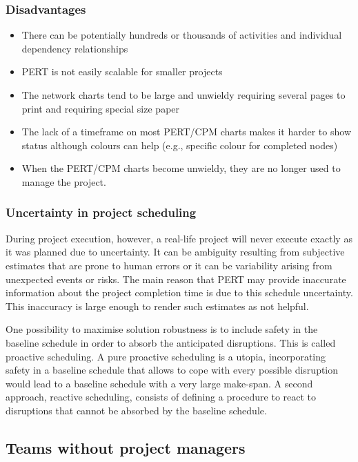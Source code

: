 \subsubsection{Disadvantages}
\begin{itemize}
\item There can be potentially hundreds or thousands of activities and individual dependency relationships
\item PERT is not easily scalable for smaller projects
\item The network charts tend to be large and unwieldy requiring several pages to print and requiring special size paper
\item The lack of a timeframe on most PERT/CPM charts makes it harder to show status although colours can help (e.g., specific colour for completed nodes)
\item When the PERT/CPM charts become unwieldy, they are no longer used to manage the project.
\end{itemize}

\subsubsection{Uncertainty in project scheduling}

During project execution, however, a real-life project will never execute exactly as it was planned due to uncertainty. It can be ambiguity resulting from subjective estimates that are prone to human errors or it can be variability arising from unexpected events or risks. The main reason that PERT may provide inaccurate information about the project completion time is due to this schedule uncertainty. This inaccuracy is large enough to render such estimates as not helpful.

One possibility to maximise solution robustness is to include safety in the baseline schedule in order to absorb the anticipated disruptions. This is called proactive scheduling. A pure proactive scheduling is a utopia, incorporating safety in a baseline schedule that allows to cope with every possible disruption would lead to a baseline schedule with a very large make-span. A second approach, reactive scheduling, consists of defining a procedure to react to disruptions that cannot be absorbed by the baseline schedule.

\subsection{Teams without project managers}

